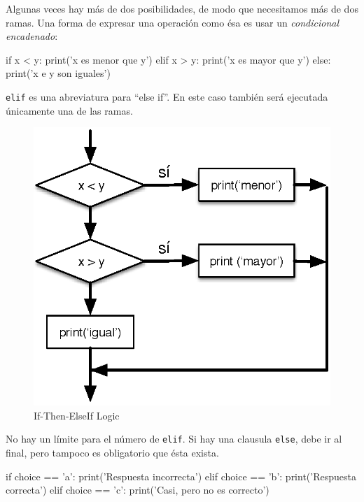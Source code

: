  

Algunas veces hay más de dos posibilidades, de modo que necesitamos más
de dos ramas. Una forma de expresar una operación como ésa es usar un
\emph{condicional encadenado}:

\begin{python}[frame=single]
if x < y:
    print('x es menor que y')
elif x > y:
    print('x es mayor que y')
else:
    print('x e y son iguales')
\end{python}

\texttt{elif} es una abreviatura para ``else if''. En este caso también
será ejecutada únicamente una de las ramas.

\begin{figure}[t]
\centering
\includegraphics{images/elif}
\caption{If-Then-ElseIf Logic}
\label{fig_elif}
\end{figure}

No hay un límite para el número de \texttt{elif}. Si hay una clausula
\texttt{else}, debe ir al final, pero tampoco es obligatorio que ésta
exista.

 

\begin{python}[frame=single]
if choice == 'a':
    print('Respuesta incorrecta')
elif choice == 'b':
    print('Respuesta correcta')
elif choice == 'c':
    print('Casi, pero no es correcto')
\end{python}

